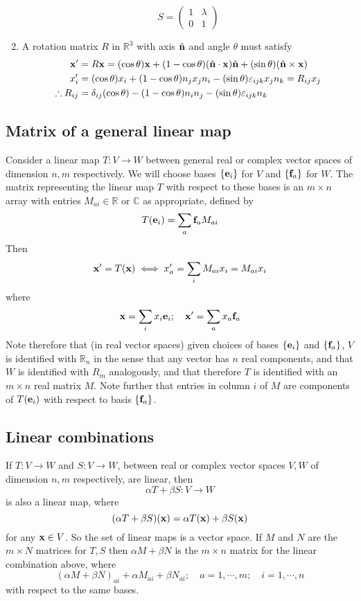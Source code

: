 \begin{example}
\begin{enumerate}
	      \[
		      S = \begin{pmatrix}
			      1 & \lambda \\ 0 & 1
		      \end{pmatrix}
	      \]
	\item A rotation matrix \(R\) in \(\mathbb R^3\) with axis \(\hat{\vb{n}}\) and angle \(\theta\) must satisfy
	      \begin{align*}
		      \vb x'            & = R\vb x = (\cos \theta)\vb x + (1 - \cos \theta)(\hat{\vb{n}} \cdot \vb x)\hat{\vb{n}} + (\sin \theta)(\hat{\vb{n}} \times \vb x) \\
		      x_i'              & = (\cos \theta)x_i + (1 - \cos \theta)n_j x_j n_i - (\sin \theta) \varepsilon_{ijk}x_j n_k = R_{ij} x_j       \\
		      \therefore R_{ij} & = \delta_{ij}(\cos \theta) - (1 - \cos \theta)n_i n_j - (\sin \theta)\varepsilon_{ijk} n_k
	      \end{align*}
\end{enumerate}
\end{example}

\subsection{Matrix of a general linear map}
Consider a linear map \(T: V \to W\) between general real or complex vector spaces of dimension \(n, m\) respectively.
We will choose bases \(\{ \vb e_i \}\) for \(V\) and \(\{ \vb f_a \}\) for \(W\).
The matrix representing the linear map \(T\) with respect to these bases is an \(m \times n\) array with entries \(M_{ai} \in \mathbb R\) or \(\mathbb C\) as appropriate, defined by
\[
	T(\vb e_i) = \sum_a \vb f_a M_{ai}
\]
Then
\[
	\vb x' = T(\vb x) \iff x_a' = \sum_i M_{ai}x_i = M_{ai}x_i
\]
where
\[
	\vb x = \sum_i x_i \vb e_i;\quad \vb x' = \sum_a x_a \vb f_a
\]
Note therefore that (in real vector spaces) given choices of bases \(\{ \vb e_i \}\) and \(\{ \vb f_a \}\), \(V\) is identified with \(\mathbb R_n\) in the sense that any vector has \(n\) real components, and that \(W\) is identified with \(R_m\) analogously, and that therefore \(T\) is identified with an \(m\times n\) real matrix \(M\).
Note further that entries in column \(i\) of \(M\) are components of \(T(\vb e_i)\) with respect to basis \(\{ \vb f_a \}\).

\subsection{Linear combinations}
If \(T: V \to W\) and \(S: V \to W\), between real or complex vector spaces \(V, W\) of dimension \(n, m\) respectively, are linear, then
\[
	\alpha T + \beta S: V \to W
\]
is also a linear map, where
\[
	(\alpha T + \beta S)(\vb x) = \alpha T(\vb x) + \beta S(\vb x)
\]
for any \(\vb x \in V\).
So the set of linear maps is a vector space.
If \(M\) and \(N\) are the \(m\times N\) matrices for \(T, S\) then \(\alpha M + \beta N\) is the \(m\times n\) matrix for the linear combination above, where
\[
	(\alpha M + \beta N)_{ai} + \alpha M_{ai} + \beta N_{ai};\quad a = 1, \cdots, m;\quad i = 1, \cdots, n
\]
with respect to the same bases.

